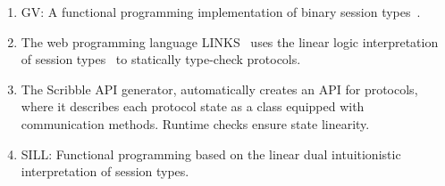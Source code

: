 \begin{enumerate}
	\item	GV:	A functional programming implementation of binary session types~\cite{DBLP:journals/jfp/Wadler14}.

	\item	The web programming language LINKS~\cite{citation_needed}
			uses the linear logic interpretation of session types~\cite{DBLP:journals/jfp/Wadler14}
			to statically type-check protocols.

	\item	The Scribble API generator, automatically creates an API for protocols,
			where it describes each protocol state as a class equipped with
			communication methods. Runtime checks ensure state linearity.

	\item	SILL:		Functional programming based on the linear dual intuitionistic interpretation of session types. 

\end{enumerate}




